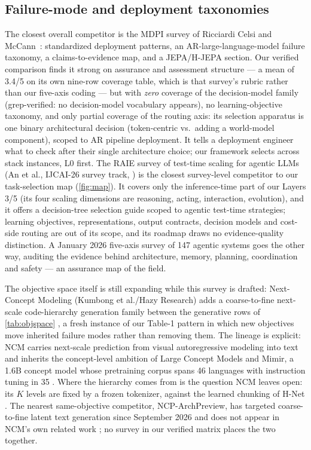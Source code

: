 \subsection{Failure-mode and deployment taxonomies}
The closest overall competitor is the MDPI survey of Ricciardi Celsi and
McCann~\cite{mdpi2026arlm}: standardized deployment patterns, an AR-large-language-model failure
taxonomy, a claims-to-evidence map, and a JEPA/H-JEPA section. Our verified comparison finds it
strong on assurance and assessment structure --- a mean of 3.4/5 on its own nine-row coverage
table, which is that survey's rubric rather than our five-axis coding --- but with \emph{zero}
coverage of the decision-model
family (grep-verified: no decision-model vocabulary appears), no learning-objective taxonomy,
and only partial coverage of the routing axis: its selection apparatus is
one binary architectural decision (token-centric vs.\ adding a world-model component), scoped to
AR pipeline deployment. It tells a deployment engineer what to check after their single
architecture choice; our framework selects across stack instances, L0 first.
The RAIE survey of test-time scaling for agentic LLMs (An et al., IJCAI-26 survey track,
\cite{raie2026}) is the closest survey-level competitor to our task-selection map
(\cref{fig:map}). It covers only the inference-time part of our Layers 3/5 (its four scaling
dimensions are reasoning, acting, interaction, evolution), and it offers a decision-tree
selection guide scoped to agentic test-time strategies; learning objectives, representations,
output contracts, decision models and cost-side routing are out of its scope, and its roadmap
draws no evidence-quality distinction. A January 2026 five-axis survey of 147 agentic systems
\cite{ssrn2026fiveaxis} goes the other way, auditing the evidence behind architecture, memory,
planning, coordination and safety --- an assurance map of the field.

The objective space itself is still expanding while this survey is drafted: Next-Concept
Modeling (Kumbong et al./Hazy Research) adds a coarse-to-fine next-scale code-hierarchy generation
family between the generative rows of \cref{tab:objspace} \cite{kumbong2026ncm}, a fresh
instance of our Table-1 pattern in which new objectives move inherited failure modes rather than
removing them. The lineage is explicit: NCM carries next-scale prediction from visual
autoregressive modeling \cite{var2024} into text and inherits the concept-level ambition of Large
Concept Models \cite{lcm2024} and Mimir, a 1.6B concept model whose pretraining corpus spans 46
languages with instruction tuning in 35 \cite{mimir2026}. Where the hierarchy comes from is the
question NCM leaves open: its $K$ levels are fixed by a frozen tokenizer, against the learned
chunking of H-Net \cite{hnet2025}. The nearest same-objective competitor, NCP-ArchPreview, has
targeted coarse-to-fine latent text generation since September 2026 and does not appear in NCM's
own related work \cite{ncparch2026}; no survey in our verified matrix places the two together.

